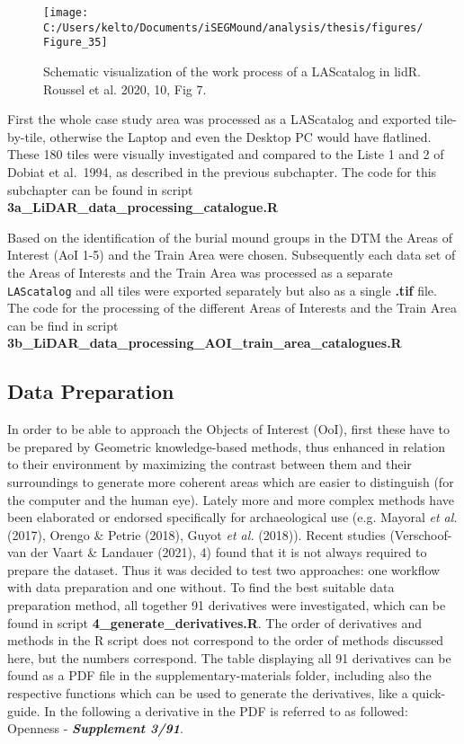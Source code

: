 \documentclass[
  12pt,
]{article}
\begin{document}
\begin{figure}

{\centering \texttt{[image: C:/Users/kelto/Documents/iSEGMound/analysis/thesis/figures/Figure\_35]} 

}

\caption{Schematic visualization of the work process of a LAScatalog in lidR. Roussel et al. 2020, 10, Fig 7.}\label{fig:Figure35}
\end{figure}

First the whole case study area was processed as a LAScatalog and exported tile-by-tile, otherwise the Laptop and even the Desktop PC would have flatlined. These 180 tiles were visually investigated and compared to the Liste 1 and 2 of Dobiat et al.~1994, as described in the previous subchapter. The code for this subchapter can be found in script \textbf{3a\_LiDAR\_data\_processing\_catalogue.R}

Based on the identification of the burial mound groups in the DTM the Areas of Interest (AoI 1-5) and the Train Area were chosen. Subsequently each data set of the Areas of Interests and the Train Area was processed as a separate \texttt{LAScatalog} and all tiles were exported separately but also as a single \textbf{.tif} file. The code for the processing of the different Areas of Interests and the Train Area can be find in script
\textbf{3b\_LiDAR\_data\_processing\_AOI\_train\_area\_catalogues.R}

\hypertarget{data-preparation}{%
\subsection{\texorpdfstring{\textbf{Data Preparation}}{Data Preparation}}\label{data-preparation}}

In order to be able to approach the Objects of Interest (OoI), first these have to be prepared by Geometric knowledge-based methods, thus enhanced in relation to their environment by maximizing the contrast between them and their surroundings to generate more coherent areas which are easier to distinguish (for the computer and the human eye). Lately more and more complex methods have been elaborated or endorsed specifically for archaeological use (e.g. Mayoral \emph{et al.} (2017), Orengo \& Petrie (2018), Guyot \emph{et al.} (2018)). Recent studies (Verschoof-van der Vaart \& Landauer (2021), 4) found that it is not always required to prepare the dataset. Thus it was decided to test two approaches: one workflow with data preparation and one without. To find the best suitable data preparation method, all together 91 derivatives were investigated, which can be found in script \textbf{4\_generate\_derivatives.R}. The order of derivatives and methods in the R script does not correspond to the order of methods discussed here, but the numbers correspond. The table displaying all 91 derivatives can be found as a PDF file in the supplementary-materials folder, including also the respective functions which can be used to generate the derivatives, like a quick-guide. In the following a derivative in the PDF is referred to as followed: Openness - \textbf{\emph{Supplement 3/91}}.
\end{document}
